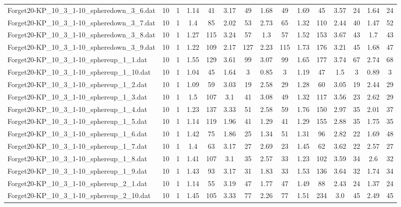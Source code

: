 \begin{table}[!ht]
{\begin{tabular}{lcccccccccccccc}
Forget20-KP\_10\_3\_1-10\_spheredown\_3\_6.dat & 10 & 1 & 1.14 & 41 & 3.17 & 49 & 1.68 & 49 & 1.69 & 45 & 3.57 & 24 & 1.64 & 24 \\
Forget20-KP\_10\_3\_1-10\_spheredown\_3\_7.dat & 10 & 1 & 1.4 & 85 & 2.02 & 53 & 2.73 & 65 & 1.32 & 110 & 2.44 & 40 & 1.47 & 52 \\
Forget20-KP\_10\_3\_1-10\_spheredown\_3\_8.dat & 10 & 1 & 1.27 & 115 & 3.24 & 57 & 1.3 & 57 & 1.52 & 153 & 3.67 & 43 & 1.7 & 43 \\
Forget20-KP\_10\_3\_1-10\_spheredown\_3\_9.dat & 10 & 1 & 1.22 & 109 & 2.17 & 127 & 2.23 & 115 & 1.73 & 176 & 3.21 & 45 & 1.68 & 47 \\
Forget20-KP\_10\_3\_1-10\_sphereup\_1\_1.dat & 10 & 1 & 1.55 & 129 & 3.61 & 99 & 3.07 & 99 & 1.65 & 177 & 3.74 & 67 & 2.74 & 68 \\
Forget20-KP\_10\_3\_1-10\_sphereup\_1\_10.dat & 10 & 1 & 1.04 & 45 & 1.64 & 3 & 0.85 & 3 & 1.19 & 47 & 1.5 & 3 & 0.89 & 3 \\
Forget20-KP\_10\_3\_1-10\_sphereup\_1\_2.dat & 10 & 1 & 1.09 & 59 & 3.03 & 19 & 2.58 & 29 & 1.28 & 60 & 3.05 & 19 & 2.44 & 29 \\
Forget20-KP\_10\_3\_1-10\_sphereup\_1\_3.dat & 10 & 1 & 1.5 & 107 & 3.1 & 41 & 3.08 & 49 & 1.32 & 117 & 3.56 & 23 & 2.62 & 29 \\
Forget20-KP\_10\_3\_1-10\_sphereup\_1\_4.dat & 10 & 1 & 1.23 & 137 & 3.33 & 51 & 2.58 & 59 & 1.76 & 150 & 2.97 & 35 & 2.01 & 37 \\
Forget20-KP\_10\_3\_1-10\_sphereup\_1\_5.dat & 10 & 1 & 1.14 & 119 & 1.96 & 41 & 1.29 & 41 & 1.29 & 155 & 2.88 & 35 & 1.75 & 35 \\
Forget20-KP\_10\_3\_1-10\_sphereup\_1\_6.dat & 10 & 1 & 1.42 & 75 & 1.86 & 25 & 1.34 & 51 & 1.31 & 96 & 2.82 & 22 & 1.69 & 48 \\
Forget20-KP\_10\_3\_1-10\_sphereup\_1\_7.dat & 10 & 1 & 1.4 & 63 & 3.17 & 27 & 2.69 & 23 & 1.45 & 62 & 3.62 & 22 & 2.57 & 27 \\
Forget20-KP\_10\_3\_1-10\_sphereup\_1\_8.dat & 10 & 1 & 1.41 & 107 & 3.1 & 35 & 2.57 & 33 & 1.23 & 102 & 3.59 & 34 & 2.6 & 32 \\
Forget20-KP\_10\_3\_1-10\_sphereup\_1\_9.dat & 10 & 1 & 1.43 & 93 & 3.17 & 31 & 1.83 & 33 & 1.53 & 136 & 3.64 & 32 & 1.74 & 34 \\
Forget20-KP\_10\_3\_1-10\_sphereup\_2\_1.dat & 10 & 1 & 1.14 & 55 & 3.19 & 47 & 1.77 & 47 & 1.49 & 88 & 2.43 & 24 & 1.37 & 24 \\
Forget20-KP\_10\_3\_1-10\_sphereup\_2\_10.dat & 10 & 1 & 1.45 & 105 & 3.33 & 77 & 2.26 & 77 & 1.51 & 234 & 3.0 & 45 & 2.49 & 45 \\

\end{tabular}}
\end{table}

